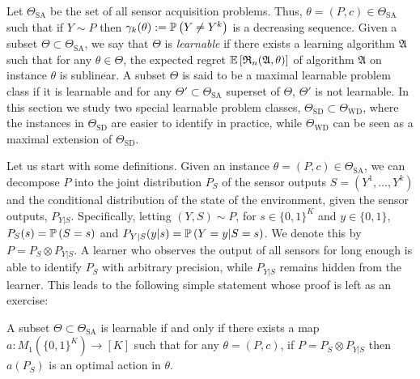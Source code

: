 \newcommand{\SA}{\mathrm{SA}}
\newcommand{\SD}{\mathrm{SD}}
\newcommand{\WD}{\mathrm{WD}}
\newcommand{\TSA}{\Theta_{\SA}}
\newcommand{\Alg}{\mathfrak{A}}
\newcommand{\TSD}{\Theta_{\SD}}
\newcommand{\TWD}{\Theta_{\WD}}
Let $\TSA$ be the set of all sensor acquisition problems. 
Thus, $\theta = (P,c)\in \TSA$ such that if $Y\sim P$ then $\gamma_k(\theta):=\mathbb{P}\left(Y\ne Y^k\right)$ 
is a decreasing sequence.
Given a subset $\Theta\subset \TSA$, we say that $\Theta$ is \emph{learnable} 
if there exists a learning algorithm $\Alg$ such that
for any $\theta\in \Theta$, the expected regret $\EE{ \Regret_n(\Alg,\theta) }$ 
of algorithm $\Alg$ on instance $\theta$ is sublinear.
A subset $\Theta$ is said to be a maximal learnable problem class if it is learnable and for any $\Theta'\subset \TSA$ superset
of $\Theta$, $\Theta'$ is not learnable.
In this section we study two special learnable problem classes, $\TSD\subset \TWD$, where the instances in $\TSD$ are easier to identify in practice, while $\TWD$ can be seen as a maximal extension of $\TSD$.

Let us start with some definitions.
Given an instance $\theta = (P,c)\in \TSA$, we can decompose $P$ into the joint distribution $P_S$ of the sensor outputs $S = (Y^1,\dots,Y^k)$ and the conditional distribution of the state of the environment, given the sensor outputs, $P_{Y|S}$.
Specifically, letting $(Y,S)\sim P$, for $s\in \{0,1\}^K$ and $y\in \{0,1\}$, $P_S(s) = \mathbb{P}\left(S = s\right)$ and $P_{Y|S}(y|s) = \mathbb{P}\left(Y=y|S=s\right)$. We denote this by $P = P_S \otimes P_{Y|S}$.
A learner who observes the output of all sensors for long enough is able to identify $P_S$ with arbitrary precision, while $P_{Y|S}$ remains hidden from the learner.
 This leads to the following simple statement whose proof is left as an exercise:
\begin{proposition}
\label{prop:learnablemap}
A subset $\Theta\subset \TSA$ is learnable if and only if there exists a map $a: M_1( \{0,1\}^K ) \to [K]$ such that 
for any $\theta= (P,c)$, if $P = P_S \otimes P_{Y|S}$ then $a(P_S)$ is an optimal action in $\theta$.
\end{proposition}

